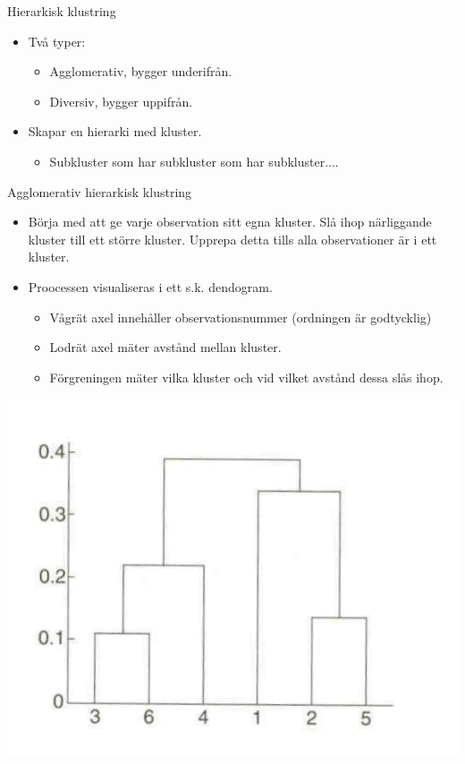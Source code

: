 \documentclass[10pt,english]{beamer}
\begin{document}
\begin{frame}{Hierarkisk klustring}

\begin{itemize}
    \item Två typer:
    \begin{itemize}
        \item Agglomerativ, bygger underifrån.
        \item Diversiv, bygger uppifrån.
    \end{itemize}
    \item Skapar en hierarki med kluster.
    \begin{itemize}
        \item Subkluster som har subkluster som har subkluster....
    \end{itemize}
\end{itemize}    
    
\end{frame}


\begin{frame}{Agglomerativ hierarkisk klustring}

    \begin{itemize}
        \item Börja med att ge varje observation sitt egna kluster. Slå ihop närliggande kluster till ett större kluster. Upprepa detta tills alla observationer är i ett kluster.
        \item Proocessen visualiseras i ett s.k. dendogram.
        \begin{itemize}
            \item Vågrät axel innehåller observationsnummer (ordningen är godtycklig)
            \item Lodrät axel mäter avstånd mellan kluster.
            \item Förgreningen mäter vilka kluster och vid vilket avstånd dessa slås ihop.
        \end{itemize}
    \end{itemize}

    \includegraphics[width = 0.5 \textwidth]{figs/dendogram1.png}
    
\end{frame}
\end{document}
